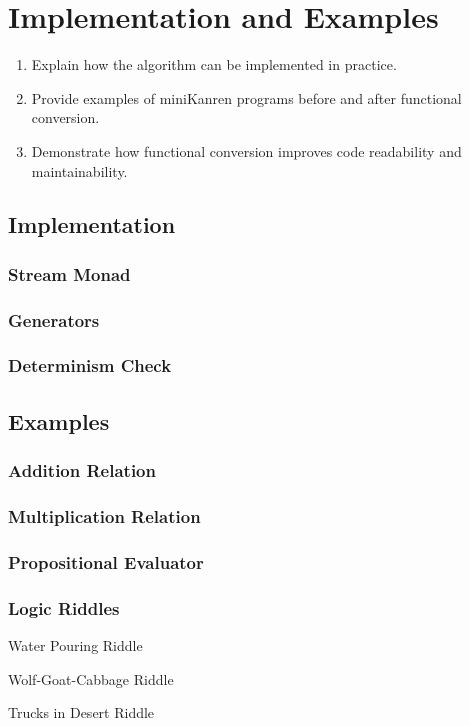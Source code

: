 \section{Implementation and Examples}

\begin{enumerate}
    \item Explain how the algorithm can be implemented in practice.
    \item Provide examples of miniKanren programs before and after functional conversion.
    \item Demonstrate how functional conversion improves code readability and maintainability.
\end{enumerate}

\subsection{Implementation}

\subsubsection{Stream Monad}

\subsubsection{Generators}

\subsubsection{Determinism Check}

\subsection{Examples}

\subsubsection{Addition Relation}

\subsubsection{Multiplication Relation}

\subsubsection{Propositional Evaluator}

\subsubsection{Logic Riddles}

Water Pouring Riddle

Wolf-Goat-Cabbage Riddle

Trucks in Desert Riddle
